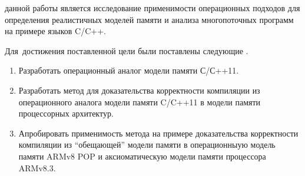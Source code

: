 



{\aim} данной работы является исследование применимости операционных
подходов для определения реалистичных моделей памяти и анализа
многопоточных программ на примере языков C/C++.

Для~достижения поставленной цели были поставлены следующие {\tasks}.
\begin{enumerate}
  \item Разработать операционный аналог модели памяти С/С++11.
  \item Разработать метод для доказательства корректности компиляции из операционного аналога модели памяти C/C++11 в модели памяти
        процессорных архитектур.
  \item Апробировать применимость метода на примере доказательства корректности компиляции из ``обещающей'' модели памяти в
        операционныую модель памяти ARMv8 POP и аксиоматическую модели памяти процессора ARMv8.3.
\end{enumerate}

